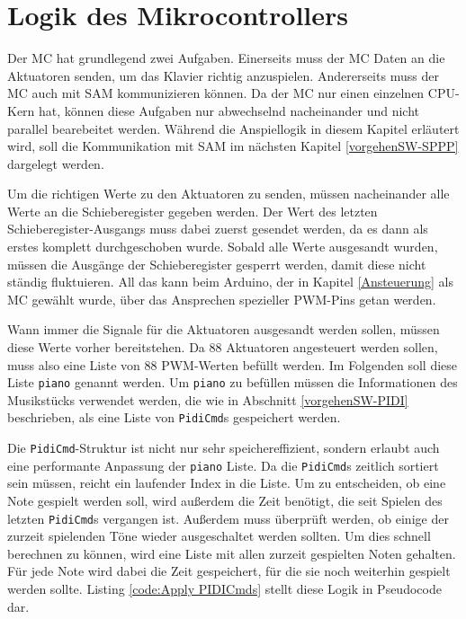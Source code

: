 \section{Logik des Mikrocontrollers} \label{vorgehenSW-MC}

Der \ac{MC} hat grundlegend zwei Aufgaben.
Einerseits muss der \ac{MC} Daten an die Aktuatoren senden, um das Klavier richtig anzuspielen.
Andererseits muss der \ac{MC} auch mit \ac{SAM} kommunizieren können.
Da der \ac{MC} nur einen einzelnen CPU-Kern hat, können diese Aufgaben nur abwechselnd nacheinander und nicht parallel bearebeitet werden.
Während die Anspiellogik in diesem Kapitel erläutert wird, soll die Kommunikation mit \ac{SAM} im nächsten Kapitel \ref{vorgehenSW-SPPP} dargelegt werden.

Um die richtigen Werte zu den Aktuatoren zu senden, müssen nacheinander alle Werte an die Schieberegister gegeben werden.
Der Wert des letzten Schieberegister-Ausgangs muss dabei zuerst gesendet werden, da es dann als erstes komplett durchgeschoben wurde.
Sobald alle Werte ausgesandt wurden, müssen die Ausgänge der Schieberegister gesperrt werden, damit diese nicht ständig fluktuieren.
All das kann beim Arduino, der in Kapitel \ref{Ansteuerung} als \ac{MC} gewählt wurde, über das Ansprechen spezieller \ac{PWM}-Pins getan werden.


Wann immer die Signale für die Aktuatoren ausgesandt werden sollen, müssen diese Werte vorher bereitstehen.
Da 88 Aktuatoren angesteuert werden sollen, muss also eine Liste von 88 \ac{PWM}-Werten befüllt werden.
Im Folgenden soll diese Liste \lstinline{piano} genannt werden.
Um \lstinline{piano} zu befüllen müssen die Informationen des Musikstücks verwendet werden, die wie in Abschnitt \ref{vorgehenSW-PIDI} beschrieben, als eine Liste von \lstinline{PidiCmd}s gespeichert werden.

Die \lstinline{PidiCmd}-Struktur ist nicht nur sehr speichereffizient, sondern erlaubt auch eine performante Anpassung der \lstinline{piano} Liste.
Da die \lstinline{PidiCmd}s zeitlich sortiert sein müssen, reicht ein laufender Index in die Liste.
Um zu entscheiden, ob eine Note gespielt werden soll, wird außerdem die Zeit benötigt, die seit Spielen des letzten \lstinline{PidiCmd}s vergangen ist.
Außerdem muss überprüft werden, ob einige der zurzeit spielenden Töne wieder ausgeschaltet werden sollten.
Um dies schnell berechnen zu können, wird eine Liste mit allen zurzeit gespielten Noten gehalten.
Für jede Note wird dabei die Zeit gespeichert, für die sie noch weiterhin gespielt werden sollte.
Listing \ref{code:Apply PIDICmds} stellt diese Logik in Pseudocode dar.

